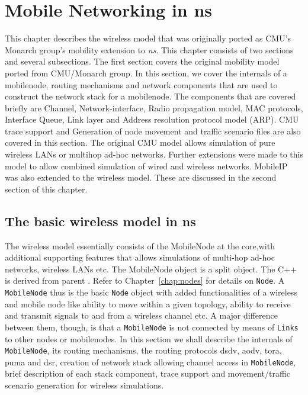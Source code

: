 \chapter{Mobile Networking in ns}
\label{chap:mobility}

This chapter describes the wireless model that was originally ported as CMU's Monarch group's mobility extension to \emph{ns}. 
This chapter consists of two sections and several subsections. The
first section covers the original mobility model ported from
CMU/Monarch group. In this section, we cover the internals of a
mobilenode, routing mechanisms and network components that are used to
construct the network stack for a mobilenode. The components that are
covered briefly are Channel, Network-interface, Radio propagation
model, MAC protocols, Interface Queue, Link layer and Address
resolution protocol model (ARP). CMU trace support and Generation of
node movement and traffic scenario files are also covered in this
section. 
The original CMU model allows simulation of pure wireless LANs or
multihop ad-hoc networks. Further extensions were made to this model
to allow combined simulation of wired and wireless networks. MobileIP
was also extended to the wireless model. These are
discussed in the second section of this chapter.                


\section{The basic wireless model in ns}
\label{sec:basic-model}

The wireless model essentially consists of the MobileNode at the core,with
additional supporting features that allows simulations of multi-hop ad-hoc
networks, wireless LANs etc. The MobileNode object is a split object. The
C++  is derived from parent
. Refer to Chapter~\ref{chap:nodes} for
details on {\tt Node}. A {\tt MobileNode} thus is the basic {\tt Node}
object with added functionalities of a wireless and mobile node like
ability to move within a given topology, ability to receive and transmit
signals to and from a wireless channel etc. A major difference between
them, though, is that a {\tt MobileNode} is not connected by means of
{\tt Links} to other nodes or mobilenodes. In this section we shall
describe the internals of {\tt MobileNode}, its routing mechanisms, the
routing protocols dsdv, aodv, tora, puma and dsr, creation of network stack
allowing channel
access in {\tt MobileNode}, brief description of each stack component,
trace support and movement/traffic scenario generation for wireless
simulations. 



